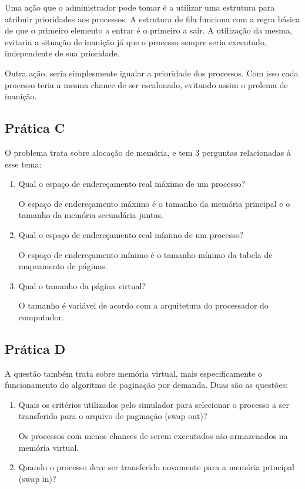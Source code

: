 \documentclass[12pt]{report}
\begin{document}
{Uma ação que o administrador pode tomar é a utilizar uma estrutura para atribuir prioridades aos processos. A estrutura de fila funciona com a regra básica de que o primeiro elemento a entrar é o primeiro a sair. A utilização da mesma, evitaria a situação de inanição já que o processo sempre seria executado, independente de sua prioridade.

Outra ação, seria simplesmente igualar a prioridade dos processos. Com isso cada processo teria a mesma chance de ser escalonado, evitando assim o prolema de inanição.

\subsection{Prática C}
O problema trata sobre alocação de memória, e tem 3 perguntas relacionadas à esse tema:
\begin{enumerate}
    \item Qual o espaço de endereçamento real máximo de um processo?
    
    O espaço de endereçamento máximo é o tamanho da memória principal e o tamanho da memória secundária juntas.
    
    \item Qual o espaço de endereçamento real mínimo de um processo?
    
    O espaço de endereçamento mínimo é o tamanho mínimo da tabela de mapeamento de páginas.
    
    \item Qual o tamanho da página virtual?
    
    O tamanho é variável de acordo com a arquitetura do processador do computador.
\end{enumerate}
\newpage
\subsection{Prática D}

A questão também trata sobre memória virtual, mais especificamente  o funcionamento do algoritmo de paginação por demanda. Duas são as questões:
\begin{enumerate}
    \item Quais os critérios utilizados pelo simulador para selecionar o processo a ser transferido para o arquivo de paginação (swap out)?
    
    Os processos com menos chances de serem executados são armazenados na memória virtual.
    
    \item Quando o processo deve ser transferido novamente para a memória principal (swap in)?
    

\end{enumerate}}
\end{document}
